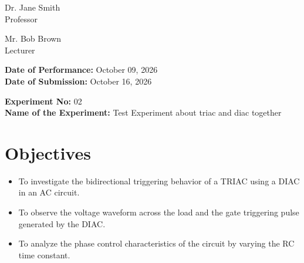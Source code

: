 \documentclass[12pt,a4paper]{article}
\begin{document}
\begin{titlepage}
\begin{minipage}[t]{0.5\textwidth}
\begin{flushright}
            Dr. Jane Smith \\
            Professor \\
            \vspace{0.3cm}
            
            Mr. Bob Brown \\
            Lecturer \\
            
            
        \end{flushright}
    \end{minipage}

    \vfill
    \textbf{Date of Performance:} October 09, 2026 \\
    \textbf{Date of Submission:} October 16, 2026
    
\end{titlepage}

\setcounter{page}{1}
\rmfamily %
\normalsize

\begin{center}
    \textbf{Experiment No:} 02 \\
    \vspace{0.2cm}
    \textbf{Name of the Experiment:} Test Experiment about triac and diac together
\end{center}
\vspace{0.5cm}


\section{Objectives}
\begin{itemize}

    \item To investigate the bidirectional triggering behavior of a TRIAC using a DIAC in an AC circuit.

    \item To observe the voltage waveform across the load and the gate triggering pulse generated by the DIAC.

    \item To analyze the phase control characteristics of the circuit by varying the RC time constant.

\end{itemize}
\end{document}
